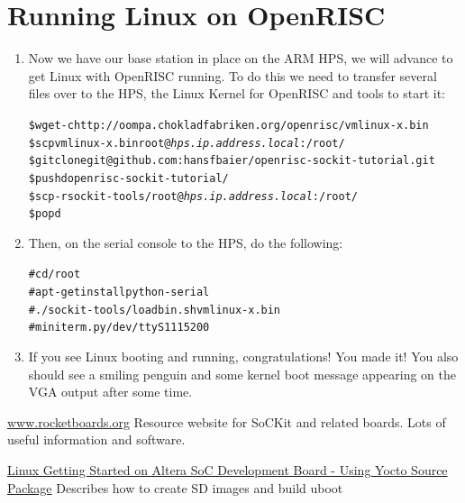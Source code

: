 \documentclass[twoside]{article}
\begin{document}
\section{Running Linux on OpenRISC}
\begin{enumerate}
\item Now we have our base station in place on the ARM HPS, we will
  advance to get Linux with OpenRISC running. To do this we need to
  transfer several files over to the HPS, the Linux
  Kernel for OpenRISC and tools to start it:
  \begin{alltt}
\$ wget -c http://oompa.chokladfabriken.org/openrisc/vmlinux-x.bin   
\$ scp vmlinux-x.bin root@\emph{hps.ip.address.local}:/root/
\$ git clone git@github.com:hansfbaier/openrisc-sockit-tutorial.git
\$ pushd openrisc-sockit-tutorial/
\$ scp -r sockit-tools/ root@\emph{hps.ip.address.local}:/root/
\$ popd
  \end{alltt}

\item Then, on the serial console to the HPS, do the following:
  \begin{alltt}
# cd /root
# apt-get install python-serial
# ./sockit-tools/loadbin.sh vmlinux-x.bin
# miniterm.py /dev/ttyS1 115200
  \end{alltt}

\item If you see Linux booting and running, congratulations! You made
  it! You also should see a smiling penguin and some kernel boot
  message appearing on the VGA output after some time.
\end{enumerate}


\begin{thebibliography}{99} 

 \url{www.rocketboards.org}
  Resource website for SoCKit and related boards. Lots of useful
  information and software.

    \href{http://www.rocketboards.org/foswiki/Documentation/AlteraSoCDevelopmentBoardYoctoGettingStarted}{Linux
      Getting Started on Altera SoC Development Board - Using Yocto
      Source Package}
    Describes how to create SD images and build uboot

\end{thebibliography}


\end{document}
